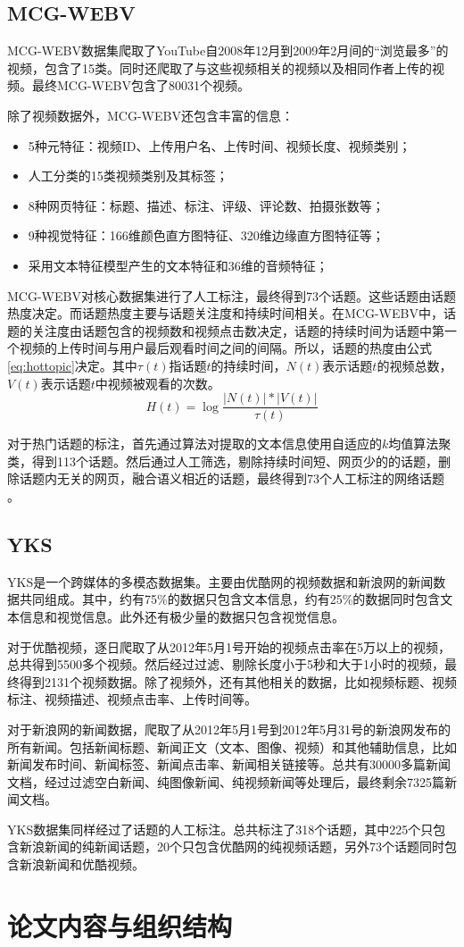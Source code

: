 \subsection{MCG-WEBV}
MCG-WEBV数据集爬取了YouTube自2008年12月到2009年2月间的“浏览最多”的视频，包含了15类。同时还爬取了与这些视频相关的视频以及相同作者上传的视频。最终MCG-WEBV包含了80031个视频。

除了视频数据外，MCG-WEBV还包含丰富的信息：
\begin{itemize}
	\item 5种元特征：视频ID、上传用户名、上传时间、视频长度、视频类别；
	\item 人工分类的15类视频类别及其标签；
	\item 8种网页特征：标题、描述、标注、评级、评论数、拍摄张数等；
	\item 9种视觉特征：166维颜色直方图特征、320维边缘直方图特征等；
	\item 采用文本特征模型产生的文本特征和36维的音频特征；
\end{itemize}

MCG-WEBV对核心数据集进行了人工标注，最终得到73个话题。这些话题由话题热度决定。而话题热度主要与话题关注度和持续时间相关。在MCG-WEBV中，话题的关注度由话题包含的视频数和视频点击数决定，话题的持续时间为话题中第一个视频的上传时间与用户最后观看时间之间的间隔。所以，话题的热度由公式\ref{eq:hottopic}决定。其中$\tau(t)$指话题$t$的持续时间，$N(t)$表示话题$t$的视频总数，$V(t)$表示话题$t$中视频被观看的次数。
\begin{equation}\label{eq:hottopic}
H(t) = \log\frac{|N(t)|*|V(t)|}{\tau(t)}
\end{equation}

对于热门话题的标注，首先通过算法对提取的文本信息使用自适应的$k$均值算法聚类，得到113个话题。然后通过人工筛选，剔除持续时间短、网页少的的话题，删除话题内无关的网页，融合语义相近的话题，最终得到73个人工标注的网络话题 。

\subsection{YKS}

YKS是一个跨媒体的多模态数据集。主要由优酷网的视频数据和新浪网的新闻数据共同组成。其中，约有75\%的数据只包含文本信息，约有25\%的数据同时包含文本信息和视觉信息。此外还有极少量的数据只包含视觉信息。

对于优酷视频，逐日爬取了从2012年5月1号开始的视频点击率在5万以上的视频，总共得到5500多个视频。然后经过过滤、剔除长度小于5秒和大于1小时的视频，最终得到2131个视频数据。除了视频外，还有其他相关的数据，比如视频标题、视频标注、视频描述、视频点击率、上传时间等。

对于新浪网的新闻数据，爬取了从2012年5月1号到2012年5月31号的新浪网发布的所有新闻。包括新闻标题、新闻正文（文本、图像、视频）和其他辅助信息，比如新闻发布时间、新闻标签、新闻点击率、新闻相关链接等。总共有30000多篇新闻文档，经过过滤空白新闻、纯图像新闻、纯视频新闻等处理后，最终剩余7325篇新闻文档。

YKS数据集同样经过了话题的人工标注。总共标注了318个话题，其中225个只包含新浪新闻的纯新闻话题，20个只包含优酷网的纯视频话题，另外73个话题同时包含新浪新闻和优酷视频。

\section{论文内容与组织结构}
